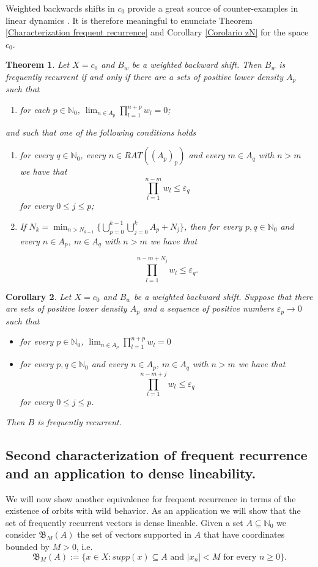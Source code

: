 \documentclass[11pt]{amsart}
\newtheorem{theorem}{Theorem}[section]
\newtheorem{corollary}[theorem]{Corollary}
\newcommand{\zN}{\mathbb N}
\begin{document}
Weighted backwards shifts in $c_0$ provide a great source of counter-examples in linear dynamics \cite{BayRuz15,BonGro18,BayGri07,Bes16}. It is therefore meaningful to enunciate Theorem \ref{Characterization frequent recurrence} and Corollary \ref{Corolario zN} for the space $c_0$.
\begin{theorem}
Let $X=c_0$ and $B_w$ be a weighted backward shift. Then $B_w$ is frequently recurrent if and only if there are a sets of positive lower density $A_p$  such that 
\begin{enumerate}
    \item [i)] for each $p\in \zN_0$, $\lim_{n\in A_{p}} \prod_{l=1}^{n+p} w_{l}=0$; 
\end{enumerate}    
    and such that one of the following conditions holds
    \begin{enumerate}
        
    \item [ii)]for every $q\in \zN_0$, every $n\in RAT((A_p)_p)$ and every $m\in A_q$ with $n>m$ we have that
$$\prod_{l=1}^{n-m} w_{l}\leq \varepsilon_q$$
for every $0\leq j\leq p$;
    \item [ii')] If $N_k=\min_{n>N_{k-1}} \{\bigcup_{p=0}^{k-1}\bigcup_{j=0}^k A_p+N_j\}$, then for every $p,q\in \zN_0$ and every $n\in A_p$, $m\in A_q$ with $n>m$ we have that
    
$$\prod_{l=1}^{n-m+N_j} w_{l}\leq \varepsilon_q.$$
    \end{enumerate}
\end{theorem}
\begin{corollary}
Let $X=c_0$ and $B_w$ be a weighted backward shift. Suppose that there are sets of positive lower density $A_p$ and a sequence of positive numbers $\varepsilon_p\to 0$ such that 
\begin{itemize}
    \item[(i)] for every $p\in\zN_0$, $\lim_{n\in A_{p}} \prod_{l=1}^{n+p} w_{l}=0$
    \item[(ii)] for every $p,q\in \zN_0$ and every $n\in A_p$, $m\in A_q$ with $n>m$ we have that
$$\prod_{l=1}^{n-m+j} w_{l}\leq \varepsilon_q$$
for every $0\leq j\leq p$.
\end{itemize} Then $B$ is frequently recurrent.
\end{corollary}


\subsection{Second characterization of frequent recurrence and an application to dense lineability. }\label{subsection segunda aplicacion}
We will now show another equivalence for frequent recurrence in terms of the existence of  orbits with wild behavior. As an application we will show that the set of frequently recurrent vectors is dense lineable. Given a set $A\subseteq \zN_0$ we consider $\mathfrak B_M(A)$ the set of vectors supported in $A$ that have coordinates bounded by $M>0$, i.e.
$$\mathfrak B_M(A):=\{x\in X: supp(x)\subseteq A \text{ and } |x_n|<M \text { for every } n\geq 0\}.$$
\end{document}
